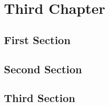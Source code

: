 \chapter{Third Chapter}
\minitocsection 
\kant
\section{First Section}
\kant
\section{Second Section}
\kant
\section{Third Section}
\kant